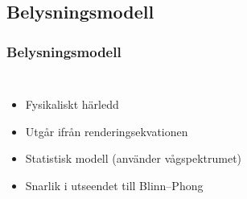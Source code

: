 \subsection{Belysningsmodell}

\begin{frame}
\frametitle{Belysningsmodell}

\begin{columns}[c]


\begin{itemize}[<+(2)->]
\item Fysikaliskt härledd
\item Utgår ifrån renderingsekvationen
\item Statistisk modell (använder vågspektrumet)
\item Snarlik i utseendet till Blinn--Phong
\end{itemize}



\end{columns}

\end{frame}
